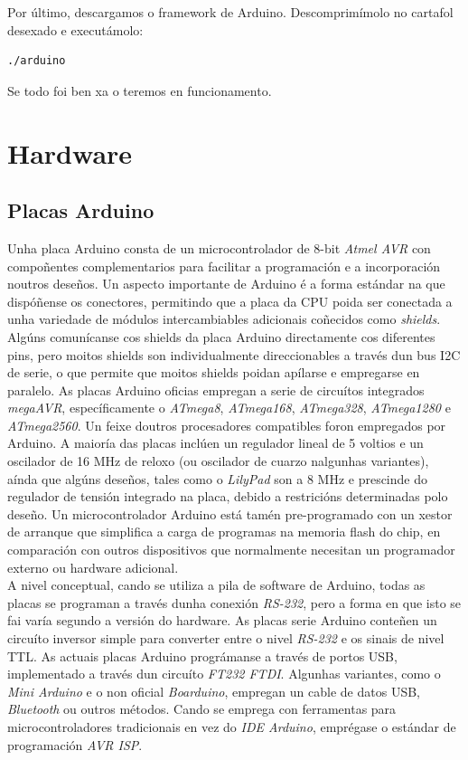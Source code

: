  Por último, descargamos o framework de Arduino. Descomprimímolo no cartafol
 desexado e executámolo: \\

 \begin{lstlisting}[language=bash,frame=single]
  ./arduino
 \end{lstlisting}

 Se todo foi ben xa o teremos en funcionamento.

\section{Hardware}

 \subsection{Placas Arduino}

 Unha placa Arduino consta de un microcontrolador de 8-bit \textit{Atmel AVR}
 con compoñentes complementarios para facilitar a programación e a
 incorporación noutros deseños. Un aspecto importante de Arduino é a forma
 estándar na que dispóñense os conectores, permitindo que a placa da CPU poida
 ser conectada a unha variedade de módulos intercambiables adicionais coñecidos
 como \textit{shields}. Algúns comunícanse cos shields da placa Arduino
 directamente cos diferentes pins, pero moitos shields son individualmente
 direccionables a través dun bus I2C de serie, o que permite que moitos shields
 poidan apílarse e empregarse en paralelo. As placas Arduino oficias empregan a
 serie de circuítos integrados \textit{megaAVR}, específicamente o
 \textit{ATmega8}, \textit{ATmega168}, \textit{ATmega328}, \textit{ATmega1280}
 e \textit{ATmega2560}. Un feixe doutros procesadores compatibles foron
 empregados por Arduino. A maioría das placas inclúen un regulador lineal de 5
 voltios e un oscilador de 16 MHz de reloxo (ou oscilador de cuarzo nalgunhas
 variantes), aínda que algúns deseños, tales como o \textit{LilyPad} son a 8
 MHz e prescinde do regulador de tensión integrado na placa, debido a
 restricións determinadas polo deseño. Un microcontrolador Arduino está tamén
 pre-programado con un xestor de arranque que simplifica a carga de programas
 na memoria flash do chip, en comparación con outros dispositivos que
 normalmente necesitan un programador externo ou hardware adicional. \\

 A nivel conceptual, cando se utiliza a pila de software de Arduino, todas as
 placas se programan a través dunha conexión \textit{RS-232}, pero a forma en
 que isto se fai varía segundo a versión do hardware. As placas serie Arduino
 conteñen un circuíto inversor simple para converter entre o nivel
 \textit{RS-232} e os sinais de nivel TTL. As actuais placas Arduino
 prográmanse a través de portos USB, implementado a través dun circuíto
 \textit{FT232 FTDI}. Algunhas variantes, como o \textit{Mini Arduino} e o non
 oficial \textit{Boarduino}, empregan un cable de datos USB, \textit{Bluetooth}
 ou outros métodos. Cando se emprega con ferramentas para microcontroladores
 tradicionais en vez do \textit{IDE Arduino}, emprégase o estándar de
 programación \textit{AVR ISP}. \\

